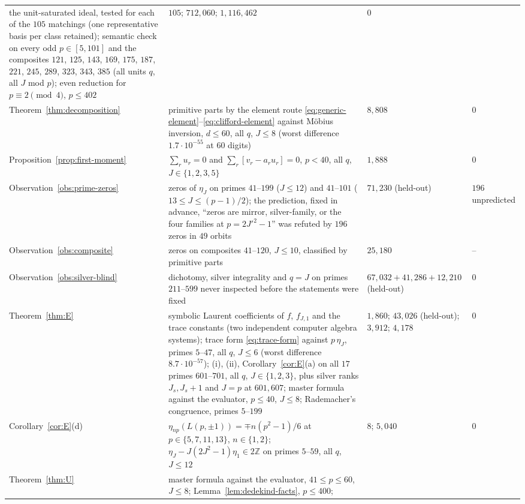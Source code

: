 \documentclass[11pt]{article}
\theoremstyle{definition}
\newcommand{\Z}{\mathbb Z}
\begin{document}
\begin{small}
\begin{longtable}{@{}L{0.24\textwidth}L{0.41\textwidth}L{0.2\textwidth}L{0.07\textwidth}@{}}
the unit-saturated ideal, tested for each of the $105$ matchings (one
representative basis per class retained); semantic check on every odd
$p\in[5,101]$ and the
composites $121$, $125$, $143$, $169$, $175$, $187$, $221$, $245$, $289$,
$323$, $343$, $385$ (all units
$q$, all $J$ mod $p$); even reduction for $p\equiv2\pmod4$, $p\leq402$
& $105$; $712{,}060$; $1{,}116{,}462$ & $0$\\
Theorem~\ref{thm:decomposition} & primitive parts by the element route
\eqref{eq:generic-element}--\eqref{eq:clifford-element} against M\"obius
inversion, $d\leq60$, all $q$, $J\leq8$ (worst difference
$1.7\cdot10^{-55}$ at $60$ digits) & $8{,}808$ & $0$\\
Proposition~\ref{prop:first-moment} & $\sum_ru_r=0$ and
$\sum_r[v_r-a_ru_r]=0$, $p<40$, all $q$, $J\in\{1,2,3,5\}$ & $1{,}888$ & $0$\\
Observation~\ref{obs:prime-zeros} & zeros of $\eta_J$ on primes
$41$--$199$ ($J\leq12$) and $41$--$101$ ($13\leq J\leq(p-1)/2$); the
prediction, fixed in advance, ``zeros are mirror, silver-family, or the four families
at $p=2J'^2-1$'' was refuted by $196$ zeros in $49$ orbits & $71{,}230$
(held-out) & $196$ unpredicted\\
Observation~\ref{obs:composite} & zeros on composites $41$--$120$,
$J\leq10$, classified by primitive parts & $25{,}180$ & --\\
Observation~\ref{obs:silver-blind} & dichotomy, silver integrality and
$q=J$ on primes $211$--$599$ never inspected before the statements were
fixed & $67{,}032+41{,}286+12{,}210$ (held-out) & $0$\\
Theorem~\ref{thm:E} & symbolic Laurent coefficients of $f$, $f_{J,1}$ and
the trace constants (two independent computer algebra systems); trace
form \eqref{eq:trace-form} against $p\,\eta_J$, primes $5$--$47$, all $q$,
$J\leq6$ (worst difference $8.7\cdot10^{-57}$); (i), (ii),
Corollary~\ref{cor:E}(a) on all $17$ primes $601$--$701$, all $q$,
$J\in\{1,2,3\}$, plus silver ranks $J_s,J_s+1$ and $J=p$ at $601,607$;
master formula against the evaluator, $p\leq40$, $J\leq8$; Rademacher's
congruence, primes $5$--$199$ & $1{,}860$; $43{,}026$ (held-out); $3{,}912$;
$4{,}178$ & $0$\\
Corollary~\ref{cor:E}(d) & $\eta_{np}(L(p,\pm1))=\mp n(p^2-1)/6$ at
$p\in\{5,7,11,13\}$, $n\in\{1,2\}$; $\eta_J-J(2J^2-1)\eta_1\in2\Z$ on
primes $5$--$59$, all $q$, $J\leq12$ & $8$; $5{,}040$ & $0$\\
Theorem~\ref{thm:U} & master formula against the evaluator,
$41\leq p\leq60$, $J\leq8$; Lemma~\ref{lem:dedekind-facts}, $p\leq400$;

\end{longtable}
\end{small}
\end{document}

